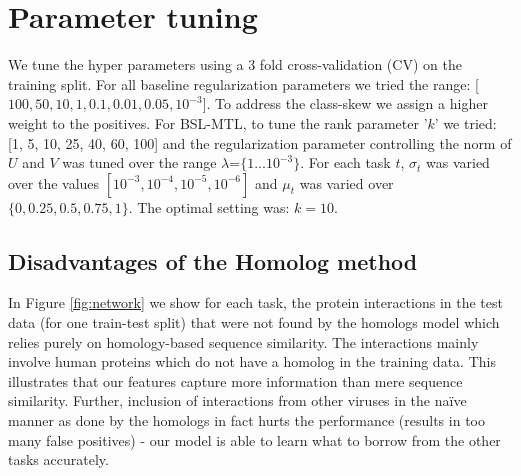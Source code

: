 \documentclass[a4paper,11pt]{article}
\begin{document}
\section{Parameter tuning}
We tune the hyper parameters using a 3 fold cross-validation (CV) on the training split. For all baseline regularization parameters %
we tried the range: [$100, 50, 10, 1, 0.1, 0.01, 0.05, 10^{-3}$]. To address the class-skew we 
assign a higher weight to the positives. For BSL-MTL, to tune the rank parameter '$k$' we tried: [1, 5, 10, 25, 40, 60, 100] and the regularization parameter controlling the norm of $U$ and $V$ was tuned over the range $\lambda$=$\{1 ... 10^{-3}\}$. For each task $t$, $\sigma_t$ was varied over the values $[10^{-3}, 10^{-4}, 10^{-5}, 10^{-6}]$ and
$\mu_t$ was varied over $\{0, 0.25, 0.5, 0.75, 1\}$.
The optimal setting was:  $k=10$. %

\subsection{Disadvantages of the Homolog method}
In Figure \ref{fig:network} we show for each task, the protein interactions in the test data (for one train-test split) that were not found by the homologs model which relies purely on homology-based sequence similarity. The interactions mainly involve human proteins which do not have a homolog in the training data. This illustrates that our features capture more information than mere sequence similarity. Further, inclusion of interactions from other viruses in the na\"ive manner as done by the homologs in fact hurts the performance (results in too many false positives) - our model is able to learn what to borrow from the other tasks accurately.
\end{document}
